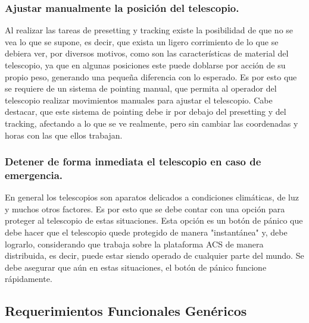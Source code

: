 \documentclass[letterpaper,spanish,10pt]{article}
\begin{document}
\subsubsection{Ajustar manualmente la posici\'on del telescopio.}
Al realizar las tareas de presetting y tracking existe la posibilidad de que no se vea lo que se supone, es decir, que exista un ligero corrimiento de lo que se debiera ver, por diversos motivos, como son las caracter\'isticas de material del telescopio, ya que en algunas posiciones este puede doblarse por acci\'on de su propio peso, generando una peque\~na diferencia con lo esperado. Es por esto que se requiere de un sistema de pointing manual, que permita al operador del telescopio realizar movimientos manuales para ajustar el telescopio. Cabe destacar, que este sistema de pointing debe ir por debajo del presetting y del tracking, afectando a lo que se ve realmente, pero sin cambiar las coordenadas y horas con las que ellos trabajan.


\subsubsection{Detener de forma inmediata el telescopio en caso de emergencia.}
En general los telescopios son aparatos delicados a condiciones clim\'aticas, de luz y muchos otros factores. Es por esto que se debe contar con una opci\'on para proteger al telescopio de estas situaciones. Esta opci\'on es un bot\'on de p\'anico que debe hacer que el telescopio quede protegido de manera "instant\'anea" y, debe lograrlo, considerando que trabaja sobre la plataforma ACS de manera distribuida, es decir, puede estar siendo operado de cualquier parte del mundo. Se debe asegurar que a\'un en estas situaciones, el bot\'on de p\'anico funcione r\'apidamente.



\subsection{Requerimientos Funcionales Gen\'ericos}
\end{document}
